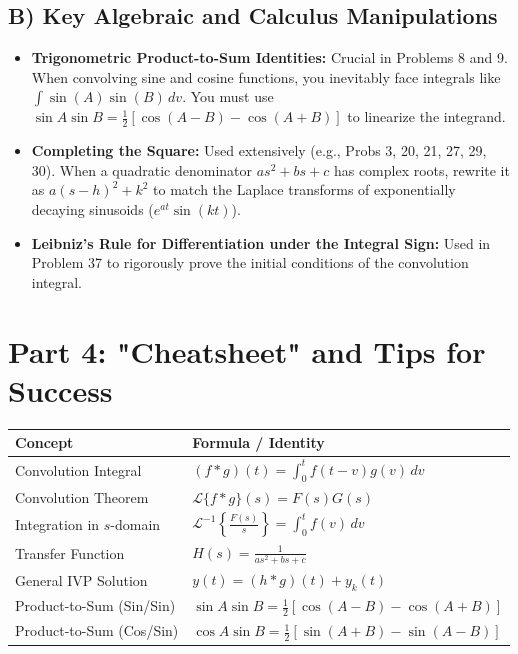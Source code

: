 \documentclass[11pt, letterpaper]{article}
\theoremstyle{definition}
\theoremstyle{remark}
\begin{document}
\subsection{B) Key Algebraic and Calculus Manipulations}
\begin{itemize}
    \item \textbf{Trigonometric Product-to-Sum Identities:} Crucial in Problems 8 and 9. When convolving sine and cosine functions, you inevitably face integrals like $\int \sin(A)\sin(B) \, dv$. You must use $\sin A \sin B = \frac{1}{2}[\cos(A-B) - \cos(A+B)]$ to linearize the integrand.
    \item \textbf{Completing the Square:} Used extensively (e.g., Probs 3, 20, 21, 27, 29, 30). When a quadratic denominator $as^2+bs+c$ has complex roots, rewrite it as $a(s-h)^2 + k^2$ to match the Laplace transforms of exponentially decaying sinusoids ($e^{at}\sin(kt)$).
    \item \textbf{Leibniz's Rule for Differentiation under the Integral Sign:} Used in Problem 37 to rigorously prove the initial conditions of the convolution integral.
\end{itemize}

\newpage
\section{Part 4: "Cheatsheet" and Tips for Success}

\begin{center}
\renewcommand{\arraystretch}{1.5}
\begin{tabularx}{\textwidth}{>{\hsize=0.3\hsize}X >{\hsize=0.7\hsize}X}
\toprule
\textbf{Concept} & \textbf{Formula / Identity} \\
\midrule
Convolution Integral & $\displaystyle (f * g)(t) = \int_0^t f(t-v)g(v) \, dv$ \\
Convolution Theorem & $\displaystyle \mathscr{L}\{f * g\}(s) = F(s)G(s)$ \\
Integration in $s$-domain & $\displaystyle \mathscr{L}^{-1}\left\{\frac{F(s)}{s}\right\} = \int_0^t f(v) \, dv$ \\
Transfer Function & $\displaystyle H(s) = \frac{1}{as^2 + bs + c}$ \\
General IVP Solution & $\displaystyle y(t) = (h * g)(t) + y_k(t)$ \\
Product-to-Sum (Sin/Sin) & $\displaystyle \sin A \sin B = \frac{1}{2}[\cos(A-B) - \cos(A+B)]$ \\
Product-to-Sum (Cos/Sin) & $\displaystyle \cos A \sin B = \frac{1}{2}[\sin(A+B) - \sin(A-B)]$ \\
\bottomrule
\end{tabularx}
\end{center}
\end{document}
